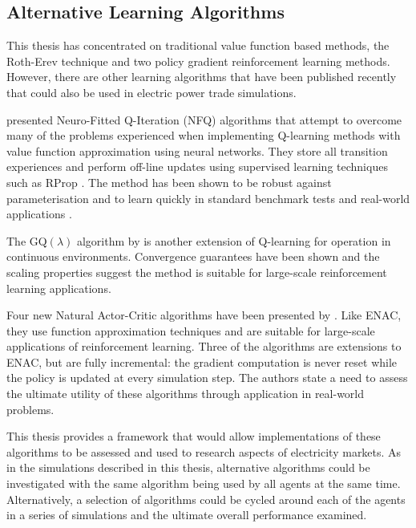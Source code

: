 
\subsection{Alternative Learning Algorithms}
This thesis has concentrated on traditional value function based methods, the
Roth-Erev technique and two policy gradient reinforcement learning methods.
However, there are other learning algorithms that have been published recently
that could also be used in electric power trade simulations.

 presented Neuro-Fitted Q-Iteration (NFQ) algorithms that
attempt to overcome many of the problems experienced when implementing
Q-learning methods with value function approximation using neural networks. They
store all transition experiences and perform off-line updates using supervised
learning techniques such as RProp \cite{riedmiller93}.  The method has been
shown to be robust against parameterisation and to learn quickly in standard
benchmark tests and real-world applications \cite{kietzmann09}.

The GQ$(\lambda)$ algorithm by  is another extension of Q-learning
for operation in continuous environments.  Convergence guarantees have been
shown and the scaling properties suggest the method is suitable for large-scale
reinforcement learning applications.

Four new Natural Actor-Critic algorithms have been presented by
. Like ENAC, they use function approximation techniques and
are suitable for large-scale applications of reinforcement learning.  Three of
the algorithms are extensions to ENAC, but are fully incremental: the gradient
computation is never reset while the policy is updated at every simulation step.
 The authors state a need to assess the ultimate utility of these algorithms
through application in real-world problems.

This thesis provides a framework that would allow implementations of these
algorithms to be assessed and used to research aspects of electricity markets.
As in the simulations described in this thesis, alternative algorithms could be
investigated with the same algorithm being used by all agents at the same time.
Alternatively, a selection of algorithms could be cycled around each of the
agents in a series of simulations and the ultimate overall performance examined.

